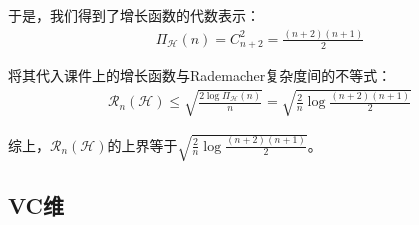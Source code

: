 \documentclass[12pt, a4paper]{article}
\newcommand{\HH}{{\mathcal{H}}}
\newcommand{\RR}{{\mathcal{R}}}
\begin{document}
        于是，我们得到了增长函数的代数表示：
        \begin{align*}
        \Pi_\HH(n) = C_{n + 2}^2 = \frac{(n + 2) (n + 1)}{2}
        \end{align*}

        将其代入课件上的增长函数与Rademacher复杂度间的不等式：
        \begin{align*}
        \RR_n(\HH) \le \sqrt{\frac{2 \log \Pi_\HH(n)}{n}} = \sqrt{\frac{2}{n} \log \frac{(n + 2) (n + 1)}{2}}
        \end{align*}

        综上，$\RR_n(\HH)$的上界等于$\sqrt{\frac{2}{n} \log \frac{(n + 2) (n + 1)}{2}}$。

    \subsection{VC维}
\end{document}
